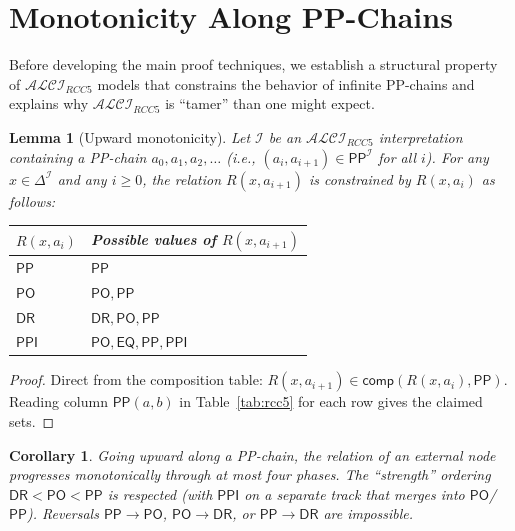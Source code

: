 \documentclass[a4paper,11pt]{article}
\newtheorem{lemma}[theorem]{Lemma}
\newtheorem{corollary}[theorem]{Corollary}
\theoremstyle{definition}
\newcommand{\ALCIRCC}[1]{\ensuremath{\mathcal{ALCI}_{\mathit{RCC#1}}}}
\newcommand{\DeltaI}{\ensuremath{\Delta^{\mathcal{I}}}}
\newcommand{\interp}{\ensuremath{\mathcal{I}}}
\newcommand{\DR}{\ensuremath{\mathsf{DR}}}
\newcommand{\PO}{\ensuremath{\mathsf{PO}}}
\newcommand{\EQ}{\ensuremath{\mathsf{EQ}}}
\newcommand{\PP}{\ensuremath{\mathsf{PP}}}
\newcommand{\PPI}{\ensuremath{\mathsf{PPI}}}
\newcommand{\comp}{\ensuremath{\mathsf{comp}}}
\begin{document}
\section{Monotonicity Along PP-Chains}
\label{sec:monotonicity}

Before developing the main proof techniques, we establish a structural
property of $\ALCIRCC{5}$ models that constrains the behavior of
infinite PP-chains and explains why $\ALCIRCC{5}$ is ``tamer'' than
one might expect.

\begin{lemma}[Upward monotonicity]
\label{lem:upward}
Let $\interp$ be an $\ALCIRCC{5}$ interpretation containing a
PP-chain $a_0, a_1, a_2, \ldots$ \textup{(}i.e., $(a_i, a_{i+1}) \in
\PP^{\interp}$ for all $i$\textup{)}.  For any $x \in \DeltaI$ and
any $i \geq 0$, the relation $R(x, a_{i+1})$ is constrained by
$R(x, a_i)$ as follows:
\begin{center}
\renewcommand{\arraystretch}{1.1}
\begin{tabular}{ll}
\toprule
$R(x, a_i)$ & Possible values of $R(x, a_{i+1})$ \\
\midrule
$\PP$  & $\PP$ \\
$\PO$  & $\PO, \PP$ \\
$\DR$  & $\DR, \PO, \PP$ \\
$\PPI$ & $\PO, \EQ, \PP, \PPI$ \\
\bottomrule
\end{tabular}
\end{center}
\end{lemma}

\begin{proof}
Direct from the composition table: $R(x, a_{i+1}) \in \comp(R(x,
a_i), \PP)$.  Reading column $\PP(a,b)$ in Table~\ref{tab:rcc5} for
each row gives the claimed sets.
\end{proof}

\begin{corollary}
\label{cor:monotone}
Going upward along a PP-chain, the relation of an external node
progresses monotonically through at most four phases.  The
``strength'' ordering $\DR < \PO < \PP$ is respected \textup{(}with
$\PPI$ on a separate track that merges into $\PO$/$\PP$\textup{)}.
Reversals $\PP \to \PO$, $\PO \to \DR$, or $\PP \to \DR$ are
impossible.
\end{corollary}
\end{document}

